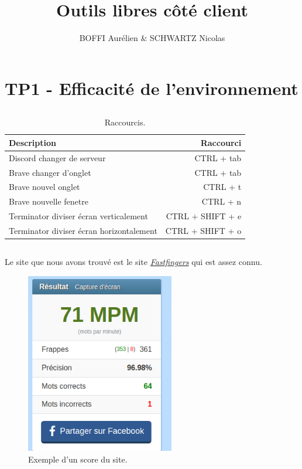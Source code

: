 \documentclass{article}
\title{Outils libres côté client}
\author{BOFFI Aurélien & SCHWARTZ Nicolas}
\begin{document}
\maketitle
\tableofcontents
\newpage

\section{TP1 - Efficacité de l'environnement}

\subsection{}

\begin{table}[h]
\centering
\begin{tabular}{l|r}

Description & Raccourci \\\hline
Discord changer de serveur  & CTRL + tab \\
\hline
Brave changer d'onglet   & CTRL + tab \\
\hline
Brave nouvel onglet   & CTRL + t \\
\hline
Brave nouvelle fenetre  & CTRL + n \\
\hline
Terminator diviser écran verticalement   & CTRL + SHIFT + e \\
\hline
Terminator diviser écran horizontalement   & CTRL + SHIFT + o \\
\hline

\end{tabular}
\caption{\label{tab:widgets}Raccourcis.}
\end{table}


\subsection{}

Le site que nous avons trouvé est le site \href{https://10fastfingers.com/typing-test/french}{\emph{Fastfingers}} qui est assez connu.

\begin{figure}[h]
\centering
    \includegraphics[height=0.7\columnwidth]{screen/Fastfingers.png}
    \caption{\label{fig:frog}Exemple d'un score du site.}
\end{figure}
\FloatBarrier
\end{document}
